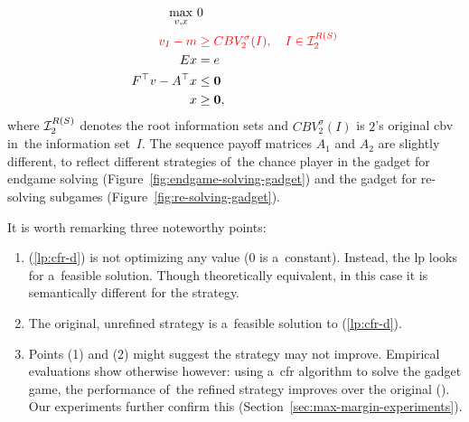 \begin{equation}
  \label{lp:cfr-d}
  \begin{split}
    \max_{v, x}\ &0 \\
    \color{red}
      v_I - m &
    \color{red}
      \ge CBV_2^\sigma(I), \quad I \in \mathcal{I}_2^{R(S)}\\ 
    Ex &= e \\
    F^\top v - A^\top x &\le \boldsymbol{0} \\
    x &\ge \boldsymbol{0},
  \end{split}
\end{equation}
where $\mathcal{I}_2^{R(S)}$ denotes the root information sets and $CBV_2^\sigma(I)$ is $2$'s original \acrlong{cbv} in~the information set~$I$.
The sequence payoff matrices $A_1$ and $A_2$ are slightly different, to reflect different strategies of~the chance player in the gadget for endgame solving (Figure~\ref{fig:endgame-solving-gadget}) and the gadget for re-solving subgames (Figure~\ref{fig:re-solving-gadget}).

It is worth remarking three noteworthy points:
\begin{enumerate}[(1)]
  \item (\ref{lp:cfr-d}) is not optimizing any value ($0$ is a~constant).
    Instead, the \acrshort{lp} looks for a~feasible solution.
    Though theoretically equivalent, in this case it is semantically different for the strategy.
  \item The original, unrefined strategy is a~feasible solution to (\ref{lp:cfr-d}).
  \item Points (1) and (2) might suggest the strategy may not improve.
    Empirical evaluations show otherwise however:
    using a~\acrshort{cfr} algorithm to solve the gadget game, the performance of~the refined strategy improves over the original (\cite{BurchJohansonBowling13}).
    Our experiments further confirm this (Section~\ref{sec:max-margin-experiments}).
\end{enumerate}

